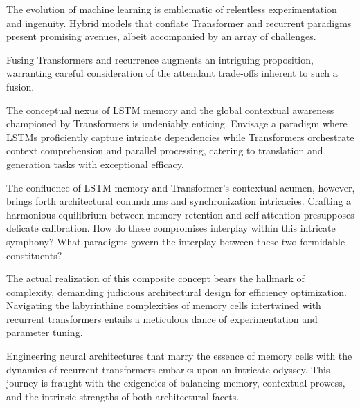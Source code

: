 \documentclass{article}
\begin{document}
The evolution of machine learning is emblematic of relentless experimentation and ingenuity. Hybrid models that conflate Transformer and recurrent paradigms present promising avenues, albeit accompanied by an array of challenges.

Fusing Transformers and recurrence augments an intriguing proposition, warranting careful consideration of the attendant trade-offs inherent to such a fusion.

The conceptual nexus of LSTM memory and the global contextual awareness championed by Transformers is undeniably enticing. Envisage a paradigm where LSTMs proficiently capture intricate dependencies while Transformers orchestrate context comprehension and parallel processing, catering to translation and generation tasks with exceptional efficacy.

The confluence of LSTM memory and Transformer's contextual acumen, however, brings forth architectural conundrums and synchronization intricacies. Crafting a harmonious equilibrium between memory retention and self-attention presupposes delicate calibration. How do these compromises interplay within this intricate symphony? What paradigms govern the interplay between these two formidable constituents?

The actual realization of this composite concept bears the hallmark of complexity, demanding judicious architectural design for efficiency optimization. Navigating the labyrinthine complexities of memory cells intertwined with recurrent transformers entails a meticulous dance of experimentation and parameter tuning.

Engineering neural architectures that marry the essence of memory cells with the dynamics of recurrent transformers embarks upon an intricate odyssey. This journey is fraught with the exigencies of balancing memory, contextual prowess, and the intrinsic strengths of both architectural facets.
\end{document}
